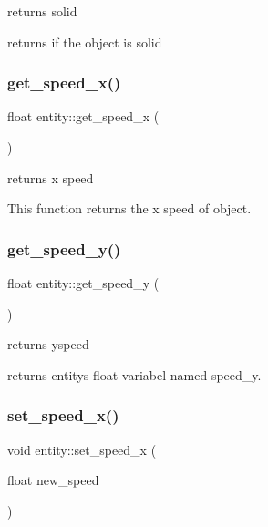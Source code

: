 returns solid 

returns if the object is solid \mbox{\label{classentity_a13d173e3d5dd4b669fc88180644b6ae4}} 
\subsubsection{\texorpdfstring{get\+\_\+speed\+\_\+x()}{get\_speed\_x()}}
{\footnotesize\ttfamily float entity\+::get\+\_\+speed\+\_\+x (\begin{DoxyParamCaption}{ }\end{DoxyParamCaption})\hspace{0.3cm}{\ttfamily [inline]}}



returns x speed 

This function returns the x speed of object. \mbox{\label{classentity_aac6ef6881c0a334a6cca1c321ffd6066}} 
\subsubsection{\texorpdfstring{get\+\_\+speed\+\_\+y()}{get\_speed\_y()}}
{\footnotesize\ttfamily float entity\+::get\+\_\+speed\+\_\+y (\begin{DoxyParamCaption}{ }\end{DoxyParamCaption})\hspace{0.3cm}{\ttfamily [inline]}}



returns yspeed 

returns entity\textquotesingle{}s float variabel named speed\+\_\+y. \mbox{\label{classentity_ab07ddec04048c0711a3684d49ae8fa91}} 
\subsubsection{\texorpdfstring{set\+\_\+speed\+\_\+x()}{set\_speed\_x()}}
{\footnotesize\ttfamily void entity\+::set\+\_\+speed\+\_\+x (\begin{DoxyParamCaption}\item[{float}]{new\+\_\+speed }\end{DoxyParamCaption})\hspace{0.3cm}{\ttfamily [inline]}}




